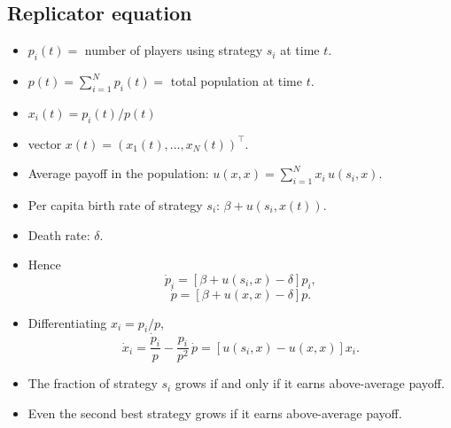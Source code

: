 \documentclass[20pt]{extarticle}
\begin{document}
\subsection*{Replicator equation}

\begin{itemize}
\item $p_i(t) = $ number of players using strategy $s_i$ at time $t$.
\item $p(t) = \sum_{i=1}^N p_i(t) = $ total population at time $t$.
\item $x_i(t) = p_i(t)/p(t)$
\item vector $x(t) = (x_1(t), \ldots, x_N(t))^{\top}$.
\item Average payoff in the population: $u(x,x) = \sum_{i=1}^N x_i\, u(s_i,x)$.
\item Per capita birth rate of strategy $s_i$: $\beta + u(s_i, x(t))$.
\item Death rate: $\delta$.
\item Hence
\[ \dot p_i = \left[\beta + u(s_i,x) - \delta\right] p_i, \]
\[ \dot p = \left[\beta + u(x,x) - \delta\right] p. \]
\item Differentiating $x_i = p_i / p$,
\[ \dot x_i = \frac{\dot p_i}{p} - \frac{p_i}{p^2}\, \dot p = \left[u(s_i,x) - u(x,x)\right] x_i. \]
\item The fraction of strategy $s_i$ grows if and only if it earns above-average payoff.
\item Even the second best strategy grows if it earns above-average payoff.
\end{itemize}


\end{document}
